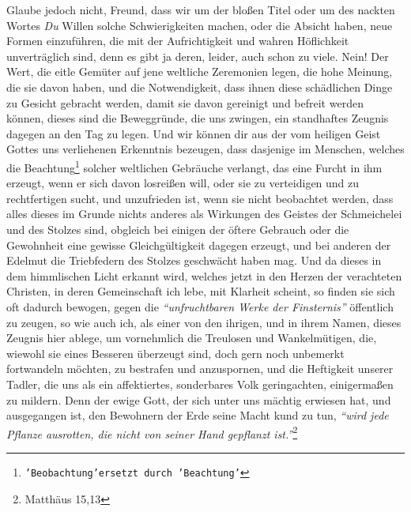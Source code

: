 Glaube jedoch nicht, Freund, dass wir um der bloßen Titel oder um des nackten
Wortes \textit{Du} Willen solche Schwierigkeiten machen, oder die Absicht haben,
neue
Formen einzuführen, die mit der Aufrichtigkeit und wahren Höflichkeit
unverträglich sind, denn es gibt ja deren, leider, auch schon zu viele. Nein!
Der Wert, die eitle Gemüter auf jene weltliche Zeremonien legen, die hohe
Meinung, die sie davon haben, und die Notwendigkeit, dass ihnen diese
schädlichen Dinge zu Gesicht gebracht werden, damit sie davon gereinigt und
befreit werden können, dieses sind die Beweggründe, die uns zwingen, ein
standhaftes Zeugnis dagegen an den Tag zu legen. Und wir können
dir aus der vom
heiligen Geist Gottes uns verliehenen Erkenntnis bezeugen, dass dasjenige im
Menschen, welches die Beachtung\footnote{\texttt{'Beobachtung'ersetzt durch
'Beachtung'}} solcher weltlichen
Gebräuche verlangt, das
eine Furcht in ihm erzeugt, wenn er sich davon losreißen will, oder sie zu
verteidigen und zu rechtfertigen sucht, und unzufrieden ist, wenn sie nicht
beobachtet werden, dass alles dieses im Grunde nichts anderes als Wirkungen des
Geistes der Schmeichelei und des Stolzes sind, obgleich bei einigen der öftere
Gebrauch oder die Gewohnheit eine gewisse Gleichgültigkeit dagegen erzeugt, und
bei anderen der Edelmut die Triebfedern des Stolzes geschwächt haben mag. Und
da dieses in dem himmlischen Licht erkannt wird, welches jetzt in den Herzen
der verachteten Christen, in deren Gemeinschaft ich lebe, mit Klarheit scheint,
so finden sie sich oft dadurch bewogen, gegen die \textit{"`unfruchtbaren Werke
der
Finsternis"'} öffentlich zu zeugen, so wie auch ich, als einer
von den ihrigen,
und in ihrem Namen, dieses Zeugnis hier ablege, um vornehmlich die Treulosen und
Wankelmütigen, die, wiewohl sie eines Besseren überzeugt sind, doch gern noch
unbemerkt fortwandeln möchten, zu bestrafen und anzuspornen, und die Heftigkeit
unserer Tadler, die uns als ein affektiertes, sonderbares Volk geringachten,
einigermaßen zu mildern. Denn der ewige Gott, der sich unter uns mächtig
erwiesen hat, und ausgegangen ist, den Bewohnern der Erde seine Macht kund zu
tun,
\textit{"`wird jede Pflanze ausrotten, die nicht von seiner Hand gepflanzt
ist."'}\footnote{Matthäus 15,13}

\medskip

